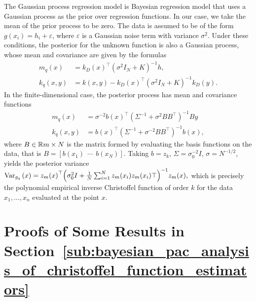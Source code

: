 \documentclass[onefignum,onetabnum]{siamart171218}
\begin{document}
The Gaussian process regression model is Bayesian regression model that uses a
Gaussian process as the prior over regression functions.
In our case, we take the mean of the prior process to be zero.
The data is assumed to be of the form $g(x_i)=h_i+\varepsilon$, where
$\varepsilon$ is a Gaussian noise term with variance $\sigma^2$.
Under these conditions, the posterior for the unknown
function is also a Gaussian process, whose mean and covariance are given by the
formulas
\begin{align}
    \label{eq:gp_kernel}
    m_q(x) &= k_D(x)^\top{\left(\sigma^2 I_N + K\right)}^{-1}h,\\
    k_q(x,y) &= 
    k(x,y) - k_D(x)^\top{\left(\sigma^2 I_N + K\right)}^{-1} k_D(y).
\end{align}
%
%
%
%
%
%
%
%
%
%
%
In the finite-dimensional case,
the posterior process 
has mean and covariance functions
\begin{align}
    \label{eq:gp_feature}
    m_q(x) &= \sigma^{-2}b(x)^\top{\left(\Sigma^{-1} + \sigma^2 BB^\top\right)}^{-1}By \\
    k_q(x,y) &= {b(x)}^\top{(\Sigma^{-1} + \sigma^{-2}BB^\top)}^{-1}b(x),
\end{align}
where $B\in\R{m\times N}$ is the matrix formed by evaluating the basis
functions on the data, that is $B=[b(x_1)~~\cdots~~b(x_N)]$.
Taking $b=z_k$, $\Sigma=\sigma_0^{-2} I$, $\sigma = N^{-1/2}$, 
yields the posterior variance
$
    \Var[g_q]{x} = {z_m(x)}^\top{\left(\sigma_0^2I  + \frac{1}{N}\sumion z_m(x_i)z_m(x_i)\top\right)}^{-1}{z_m(x)},
    $
which is precisely the polynomial empirical inverse Christoffel function of
order $k$ for the data $x_1,\dotsc,x_n$ evaluated at the point $x$.

\section{Proofs of Some Results in
Section~\ref{sub:bayesian_pac_analysis_of_christoffel_function_estimators}}
\quad
\end{document}
